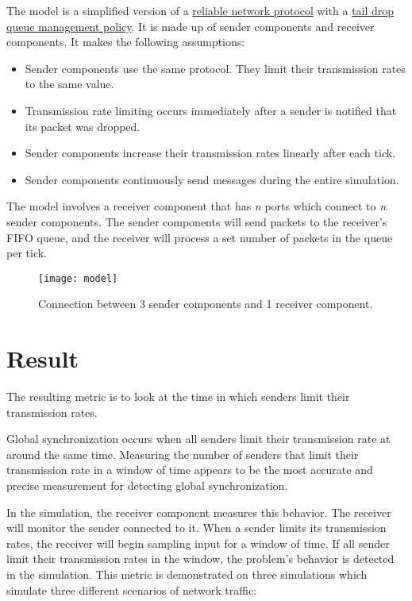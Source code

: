 \documentclass{article}
\begin{document}
The model is a simplified version of a \href{https://en.wikipedia.org/wiki/Reliability_(computer_networking)}{reliable network protocol} with a \href{https://en.wikipedia.org/wiki/Tail_drop}{tail drop queue management policy}. It is made up of sender components and receiver components. It makes the following assumptions:

\begin{itemize}
	\item Sender components use the same protocol. They limit their transmission rates to the same value.
	\item Transmission rate limiting occurs immediately after a sender is notified that its packet was dropped.
	\item Sender components increase their transmission rates linearly after each tick.
	\item Sender components continuously send messages during the entire simulation.
\end{itemize}

The model involves a receiver component that has \textit{n} ports which connect to \textit{n} sender components. The sender components will send packets to the receiver's FIFO queue, and the receiver will process a set number of packets in the queue per tick. 

\begin{figure}[H]
	\centering
	\texttt{[image: model]}
	\caption{Connection between 3 sender components and 1 receiver component.}
\end{figure}

\section{Result} %

The resulting metric is to look at the time in which senders limit their transmission rates.

Global synchronization occurs when all senders limit their transmission rate at around the same time. Measuring the number of senders that limit their transmission rate in a window of time appears to be the most accurate and precise measurement for detecting global synchronization.
						
In the simulation, the receiver component measures this behavior. The receiver will monitor the sender connected to it. When a sender limits its transmission rates, the receiver will begin sampling input for a window of time. If all sender limit their transmission rates in the window, the problem's behavior is detected in the simulation. This metric is demonstrated on three simulations which simulate three different scenarios of network traffic:
											
\end{document}
